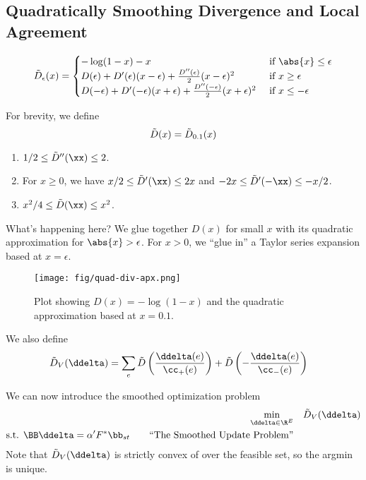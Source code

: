 \subsection{Quadratically Smoothing Divergence and Local Agreement}

\[
  \sdiv_{\epsilon}(x) =
  \begin{cases}
    -\log(1-x) - x & \text{ if } \abs{x} \leq \epsilon \\
    D(\epsilon) + D'(\epsilon) (x - \epsilon) 
    +\frac{D''(\epsilon)}{2} (x - \epsilon)^2
    & \text{ if }  x \geq \epsilon \\
    D(-\epsilon) + D'(-\epsilon) (x + \epsilon) 
    +\frac{D''(-\epsilon)}{2} (x +\epsilon)^2
    & \text{ if }  x \leq -\epsilon \\
  \end{cases}
\]

For brevity, we define
\[
  \tilde{D}(x) =\tilde{D}_{0.1}(x) 
\]
\begin{lemma}
  \label{lem:sdivderivs}
  \noindent
  \begin{enumerate}
  \item $1/2 \leq \sdiv''(\xx) \leq 2$.
  \item For $x \geq 0$, we have $x/2 \leq \sdiv'(\xx) \leq 2x$
and $-2x \leq \sdiv'(-\xx) \leq -x/2$.
\item $x^2/4 \leq \sdiv(\xx) \leq x^2$.
  \end{enumerate}
\end{lemma}

What's happening here? We glue together $D(x)$ for small $x$ with its
quadratic approximation for $\abs{x} > \epsilon$.
For $x > 0$, we ``glue in'' a Taylor series expansion based at $x =
\epsilon$.

\begin{figure}[H]
  \centering
    \texttt{[image: fig/quad-div-apx.png]} %
    \caption{Plot showing ${D(x) = -\log(1-x)}$ and the quadratic
      approximation based at $x = 0.1$.}
\end{figure}


We also define
  \begin{align*}
  \sdiv_V( \ddelta )
 &=
    \sum_e
     \sdiv\left(\frac{\ddelta(e)}{\cc_+(e)}\right)
    +
     \sdiv\left(-\frac{\ddelta(e)}{\cc_-(e)}\right)
  \end{align*}

We can now introduce the smoothed optimization problem
\begin{align}
   \label{eq:sdivflow}
  \min_{\ddelta \in \R^E} & \quad 
     \sdiv_V( \ddelta )
  \\
  \textrm{s.t. }  \BB\ddelta = \alpha' F^* \bb_{st}
\tag*{``The Smoothed Update Problem''}
\end{align}
Note that  $\sdiv_V( \ddelta )$ is strictly convex of over the
feasible set, so the argmin is unique.


